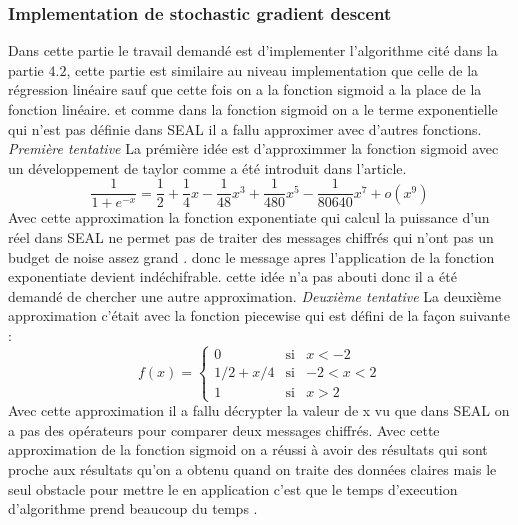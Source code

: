 \documentclass[a4paper,12pt]{article}
\begin{document}
  \subsubsection{Implementation de stochastic gradient descent}
  Dans cette partie le travail demandé est d'implementer l'algorithme cité dans la partie $4.2$, cette partie est similaire au niveau implementation que celle de la régression linéaire sauf que cette fois on a la fonction sigmoid a la place de la fonction linéaire.
  et comme dans la fonction sigmoid on a le terme exponentielle qui n'est pas définie dans SEAL il a fallu approximer avec d'autres fonctions.\newline
  \textit{Première tentative}\newline
  La prémière idée est d'approximmer la fonction sigmoid avec un développement de taylor comme a été introduit dans l'article\cite{deowlin2017manual}.\newline
  \newcommand\omicron{o}
  $$\dfrac{1}{1+e^{-x}} = \dfrac{1}{2} + \dfrac{1}{4}x - \dfrac{1}{48}x^3 + \dfrac{1}{480}x^5 - \dfrac{1}{80640}x^7 + \omicron(x^9)$$
  Avec cette approximation la fonction exponentiate qui calcul la puissance d'un réel dans SEAL ne permet pas de traiter des messages chiffrés qui n'ont pas un budget de noise assez grand . donc le message apres l'application de la fonction exponentiate devient indéchifrable.\newline
  cette idée n'a pas abouti donc il a été demandé de chercher une autre approximation.\newline  
  \textit{Deuxième tentative}\newline  
  La deuxième approximation c'était avec la fonction piecewise qui est défini de la façon suivante :\newline
  \begin{equation}
f(x)=
\left\lbrace
\begin{array}{ccc}
0  & \mbox{si} & x<-2\\
1/2 + x/4 & \mbox{si} & -2<x<2\\
1 & \mbox{si} & x>2
\end{array}\right.
\end{equation} 
Avec cette approximation il a fallu décrypter la valeur de x vu que dans SEAL on a pas des opérateurs pour comparer deux messages chiffrés.\newline 
Avec cette approximation de la fonction sigmoid on a réussi à avoir des résultats qui sont proche aux résultats qu'on a obtenu quand on traite des données claires  mais le seul obstacle pour mettre le en application c'est que le temps d'execution d'algorithme prend beaucoup du temps . 
\end{document}
